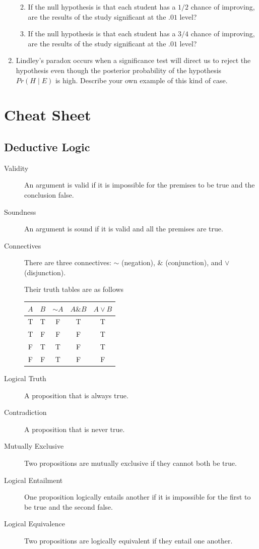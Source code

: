 \documentclass[justified]{tufte-book}
\providecommand{\tightlist}{%
  \setlength{\itemsep}{0pt}\setlength{\parskip}{0pt}}
\newcommand{\given}{\mid}
\renewcommand{\neg}{\mathbin{\sim}}
\renewcommand{\wedge}{\mathbin{\&}}
\newcommand{\p}{Pr}
\theoremstyle{definition}
\theoremstyle{definition}
\theoremstyle{definition}
\theoremstyle{remark}
\begin{document}
\begin{enumerate}
  \begin{enumerate}
  \def\labelenumii{\alph{enumii}.}
  \tightlist
  \item
    If the null hypothesis is that each student has a \(1/2\) chance of improving, are the results of the study significant at the \(.01\) level?
  \item
    If the null hypothesis is that each student has a \(3/4\) chance of improving, are the results of the study significant at the \(.01\) level?
  \end{enumerate}
\item
  Lindley's paradox occurs when a significance test will direct us to reject the hypothesis even though the posterior probability of the hypothesis \(\p(H \given E)\) is high. Describe your own example of this kind of case.
\end{enumerate}

\hypertarget{appendix-appendix}{%
\appendix}


\hypertarget{cheat-sheet}{%
\chapter{Cheat Sheet}\label{cheat-sheet}}

\hypertarget{deductive-logic}{%
\section*{Deductive Logic}\label{deductive-logic}}

\begin{description}
\item[Validity]
An argument is valid if it is impossible for the premises to be true and the conclusion false.
\item[Soundness]
An argument is sound if it is valid and all the premises are true.
\item[Connectives]
There are three connectives: \(\neg\) (negation), \(\wedge\) (conjunction), and \(\vee\) (disjunction).

Their truth tables are as follows

\begin{longtable}[]{@{}ccccc@{}}
\toprule
\(A\) & \(B\) & \(\neg A\) & \(A \wedge B\) & \(A \vee B\)\tabularnewline
\midrule
\endhead
T & T & F & T & T\tabularnewline
T & F & F & F & T\tabularnewline
F & T & T & F & T\tabularnewline
F & F & T & F & F\tabularnewline
\bottomrule
\end{longtable}
\item[Logical Truth]
A proposition that is always true.
\item[Contradiction]
A proposition that is never true.
\item[Mutually Exclusive]
Two propositions are mutually exclusive if they cannot both be true.
\item[Logical Entailment]
One proposition logically entails another if it is impossible for the first to be true and the second false.
\item[Logical Equivalence]
Two propositions are logically equivalent if they entail one another.
\end{description}
\end{document}
